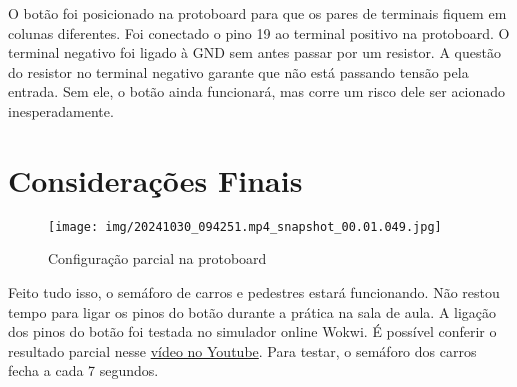 \documentclass[12pt]{article}
\begin{document}
O botão foi posicionado na protoboard para que os pares de terminais fiquem em colunas diferentes. Foi conectado o pino 19 ao terminal positivo na protoboard. O terminal negativo foi ligado à GND sem antes passar por um resistor. A questão do resistor no terminal negativo garante que não está passando tensão pela entrada. Sem ele, o botão ainda funcionará, mas corre um risco dele ser acionado inesperadamente.

\section{Considerações Finais}\label{sec:considerações-finais}

\begin{figure}[H]
    \centering
    \texttt{[image: img/20241030\_094251.mp4\_snapshot\_00.01.049.jpg]}
    \caption{Configuração parcial na protoboard}
    \label{fig:protoboard}
\end{figure}

Feito tudo isso, o semáforo de carros e pedestres estará funcionando. Não restou tempo para ligar os pinos do botão durante a prática na sala de aula. A ligação dos pinos do botão foi testada no simulador online Wokwi. É possível conferir o resultado parcial nesse \href{https://youtu.be/4dnnWBfyLOo}{vídeo no Youtube}. Para testar, o semáforo dos carros fecha a cada 7 segundos.
\end{document}
